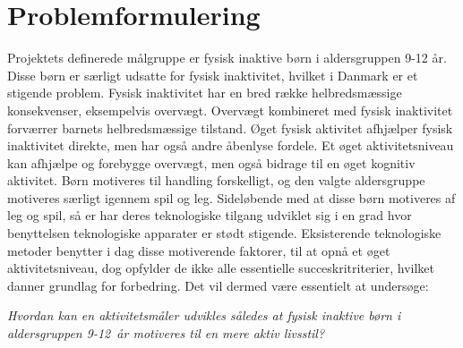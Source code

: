 \newpage \section{Problemformulering}\label{Problemformulering}
Projektets definerede målgruppe er fysisk inaktive børn i aldersgruppen 9-12 år. Disse børn er særligt udsatte for fysisk inaktivitet, hvilket i Danmark er et stigende problem. Fysisk inaktivitet har en bred række helbredsmæssige konsekvenser, eksempelvis overvægt. Overvægt kombineret med fysisk inaktivitet forværrer barnets helbredsmæssige tilstand. Øget fysisk aktivitet afhjælper fysisk inaktivitet direkte, men har også andre åbenlyse fordele. Et øget aktivitetsniveau kan afhjælpe og forebygge overvægt, men også bidrage til en øget kognitiv aktivitet. Børn motiveres til handling forskelligt, og den valgte aldersgruppe motiveres særligt igennem spil og leg. Sideløbende med at disse børn motiveres af leg og spil, så er har deres teknologiske tilgang udviklet sig i en grad hvor benyttelsen teknologiske apparater er stødt stigende. Eksisterende teknologiske metoder benytter i dag disse motiverende faktorer, til at opnå et øget aktivitetsniveau, dog opfylder de ikke alle essentielle succeskritriterier, hvilket danner grundlag for forbedring. Det vil dermed være essentielt at undersøge:

\begin{center}
\textit{Hvordan kan en aktivitetsmåler udvikles således at fysisk inaktive børn i aldersgruppen 9-12~år motiveres til en mere aktiv livsstil?}
\end{center}


%
%	

